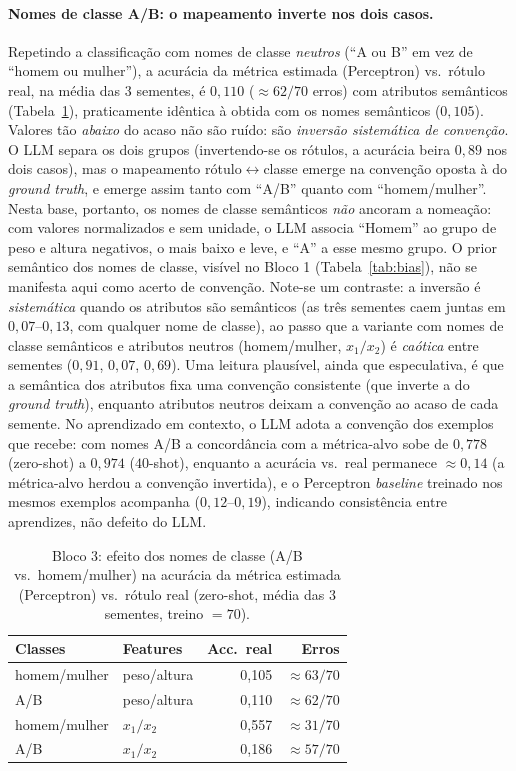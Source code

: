 \documentclass[12pt,a4paper]{article}
\begin{document}
\paragraph{Nomes de classe A/B: o mapeamento inverte nos dois casos.}
Repetindo a classificação com nomes de classe \emph{neutros} (``A ou B'' em vez de
``homem ou mulher''), a acurácia da métrica estimada (Perceptron) vs.\ rótulo real, na
média das $3$ sementes, é $0{,}110$ ($\approx 62/70$ erros) com atributos semânticos
(Tabela~\ref{tab:real_ab}), praticamente idêntica à obtida com os nomes semânticos
($0{,}105$). Valores tão \emph{abaixo} do acaso não são ruído: são \emph{inversão
sistemática de convenção}. O LLM separa os dois grupos (invertendo-se os rótulos, a
acurácia beira $0{,}89$ nos dois casos), mas o mapeamento rótulo$\leftrightarrow$classe
emerge na convenção oposta à do \emph{ground truth}, e emerge assim tanto com ``A/B''
quanto com ``homem/mulher''. Nesta base, portanto, os nomes de classe semânticos
\emph{não} ancoram a nomeação: com valores normalizados e sem unidade, o LLM associa
``Homem'' ao grupo de peso e altura negativos, o mais baixo e leve, e ``A'' a esse mesmo
grupo. O prior semântico dos nomes de classe, visível no Bloco 1
(Tabela~\ref{tab:bias}), não se manifesta aqui como acerto de convenção. Note-se um
contraste: a inversão é \emph{sistemática} quando os atributos são semânticos (as três
sementes caem juntas em $0{,}07$–$0{,}13$, com qualquer nome de classe), ao passo que a
variante com nomes de classe semânticos e atributos neutros (homem/mulher, $x_1/x_2$) é
\emph{caótica} entre sementes ($0{,}91$, $0{,}07$, $0{,}69$). Uma leitura plausível, ainda
que especulativa, é que a semântica dos atributos fixa uma convenção consistente (que
inverte a do \emph{ground truth}), enquanto atributos neutros deixam a convenção ao acaso
de cada semente. No aprendizado em contexto, o LLM adota a convenção dos exemplos que
recebe: com nomes A/B a concordância com a métrica-alvo sobe de $0{,}778$ (zero-shot) a
$0{,}974$ ($40$-shot), enquanto a acurácia vs.\ real permanece $\approx 0{,}14$ (a
métrica-alvo herdou a convenção invertida), e o Perceptron \emph{baseline} treinado nos
mesmos exemplos acompanha ($0{,}12$–$0{,}19$), indicando consistência entre aprendizes, não
defeito do LLM.

\begin{table}[ht]
\centering
\caption{Bloco 3: efeito dos nomes de classe (A/B vs.\ homem/mulher) na acurácia da
métrica estimada (Perceptron) vs.\ rótulo real (zero-shot, média das $3$ sementes,
treino $=70$).}
\label{tab:real_ab}
\begin{tabular}{llrr}
\toprule
\textbf{Classes} & \textbf{Features} & \textbf{Acc.\ real} & \textbf{Erros} \\
\midrule
homem/mulher & peso/altura & 0,105 & $\approx 63/70$ \\
A/B          & peso/altura & 0,110 & $\approx 62/70$ \\
homem/mulher & $x_1/x_2$   & 0,557 & $\approx 31/70$ \\
A/B          & $x_1/x_2$   & 0,186 & $\approx 57/70$ \\
\bottomrule
\end{tabular}
\end{table}
\end{document}
